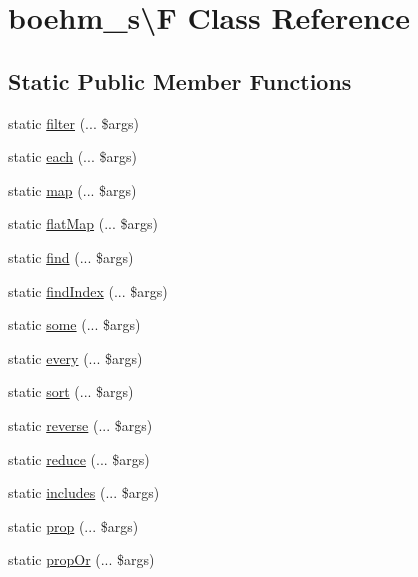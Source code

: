 \hypertarget{classboehm__s_1_1F}{}\section{boehm\+\_\+s\textbackslash{}F Class Reference}
\label{classboehm__s_1_1F}
\subsection*{Static Public Member Functions}
\begin{DoxyCompactItemize}
\item 
static \hyperlink{classboehm__s_1_1F_a80fe06fb52d10a68a0d6b36ca821463f}{filter} (... \$args)
\item 
static \hyperlink{classboehm__s_1_1F_adf594aee11edbf796efae99d00dc8f46}{each} (... \$args)
\item 
static \hyperlink{classboehm__s_1_1F_a5b9016a3452e48e05c20c3ca94e5b4e8}{map} (... \$args)
\item 
static \hyperlink{classboehm__s_1_1F_a92bf70afadb55e6b39bad69909c6e697}{flat\+Map} (... \$args)
\item 
static \hyperlink{classboehm__s_1_1F_a68db344c2eabeb0f3139ec3000a8b039}{find} (... \$args)
\item 
static \hyperlink{classboehm__s_1_1F_a385a847258b151462eb4fa8e6e06a069}{find\+Index} (... \$args)
\item 
static \hyperlink{classboehm__s_1_1F_aee63ff04d9ecde792865a5435a6e8cc9}{some} (... \$args)
\item 
static \hyperlink{classboehm__s_1_1F_a559bfb165c4ec768a49830173fa709e3}{every} (... \$args)
\item 
static \hyperlink{classboehm__s_1_1F_a742910125ee71afd3149a16262506600}{sort} (... \$args)
\item 
static \hyperlink{classboehm__s_1_1F_a560daa6ae48b7a41c82c6e42e747ec6a}{reverse} (... \$args)
\item 
static \hyperlink{classboehm__s_1_1F_a110a6463a6551b88915ed3ce87d56fb3}{reduce} (... \$args)
\item 
static \hyperlink{classboehm__s_1_1F_aa695a4a8ea655ab5d7011f205eb49de7}{includes} (... \$args)
\item 
static \hyperlink{classboehm__s_1_1F_a6c075d73d686e5bb71456a03e13d6d16}{prop} (... \$args)
\item 
static \hyperlink{classboehm__s_1_1F_a0b5ab6c3448ef372f531576bc390d88a}{prop\+Or} (... \$args)
\item 

\end{DoxyCompactItemize}
